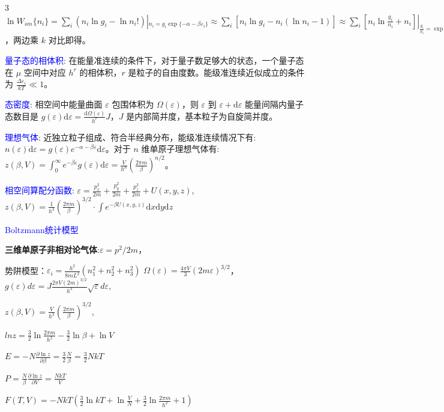 \documentclass[a4paper,8pt]{extarticle} %
\newcommand{\bluetext}[1]{\textcolor{blue}{#1}}
\begin{document}
\begin{multicols}{3}
$\ln W_{sm}\{n_i\} = \sum_i (n_i\ln g_i - \ln n_i!)|_{n_i=g_i\exp\{-\alpha-\beta\varepsilon_i\}} \approx \sum_i [n_i\ln g_i - n_i(\ln n_i-1)] \approx \sum_i [n_i\ln \frac{g_i}{n_i} + n_i]|_{\frac{g_i}{n_i}=\exp\{\alpha+\beta\varepsilon_i\}} = \sum_i n_i(\alpha + \beta\varepsilon_i + 1) = N\alpha + \beta E + N = N(\ln z - \beta\frac{\partial\ln z}{\partial\beta}) + N(1-\ln N)$，两边乘 $k$ 对比即得。

\bluetext{量子态的相体积}: 在能量准连续的条件下，对于量子数足够大的状态，一个量子态在 $\mu$ 空间中对应 $h^r$ 的相体积，$r$ 是粒子的自由度数。能级准连续近似成立的条件为 $\frac{\Delta \varepsilon_i}{kT} \ll 1$。

\bluetext{态密度}: 相空间中能量曲面 $\varepsilon$ 包围体积为 $\Omega(\varepsilon)$，则 $\varepsilon$ 到 $\varepsilon + \mathrm{d}\varepsilon$ 能量间隔内量子态数目是 $g(\varepsilon)\mathrm{d}\varepsilon = \frac{\mathrm{d}\Omega(\varepsilon)}{h^r}J$，$J$ 是内部简并度，基本粒子为自旋简并度。

\bluetext{理想气体}: 近独立粒子组成、符合半经典分布，能级准连续情况下有: $n(\varepsilon)\mathrm{d}\varepsilon = g(\varepsilon)e^{-\alpha-\beta\varepsilon}\mathrm{d}\varepsilon$。对于 $n$ 维单原子理想气体有: $z(\beta,V) = \int_0^{\infty}e^{-\beta\varepsilon}g(\varepsilon)\mathrm{d}\varepsilon = \frac{V}{h^n}\left(\frac{2\pi m}{\beta}\right)^{n/2}$。

\bluetext{相空间算配分函数}: $\varepsilon = \frac{p_x^2}{2m} + \frac{p_y^2}{2m} + \frac{p_z^2}{2m} + U(x,y,z)$, $z(\beta,V) = \frac{1}{h^3}\left(\frac{2\pi m}{\beta}\right)^{3/2}\cdot\int e^{-\beta U(x,y,z)}\mathrm{d}x\mathrm{d}y\mathrm{d}z$

\bluetext{Boltzmann统计模型}

\textbf{三维单原子非相对论气体}:$\varepsilon = p^2/2m$，

势阱模型：$\varepsilon_i = \frac{h^2}{8mL^2}(n_1^2+n_2^2+n_3^2)$
$\Omega(\varepsilon) = \frac{4\pi V}{3}(2m\varepsilon)^{3/2}$，$g(\varepsilon)d\varepsilon = J\frac{2\pi V(2m)^{3/2}}{h^3}\sqrt{\varepsilon}d\varepsilon$,

$z(\beta,V)=\frac{V}{h^3}\left(\frac{2\pi m}{\beta}\right)^{3/2}$,

$lnz=\frac{3}{2}\ln \frac{2\pi m}{h^2} - \frac{3}{2}\ln\beta + \ln V$

$E=-N\frac{\partial \ln z}{\partial \beta} = \frac{3}{2}\frac{N}{\beta} = \frac{3}{2}NkT$

$P=\frac{N}{\beta}\frac{\partial \ln z}{\partial V} = \frac{NkT}{V}$

$F(T,V) = -NkT(\frac{3}{2}\ln kT + \ln \frac{V}{N} + \frac{3}{2}\ln \frac{2\pi m}{h^2} + 1)$


\end{multicols}
\end{document}
